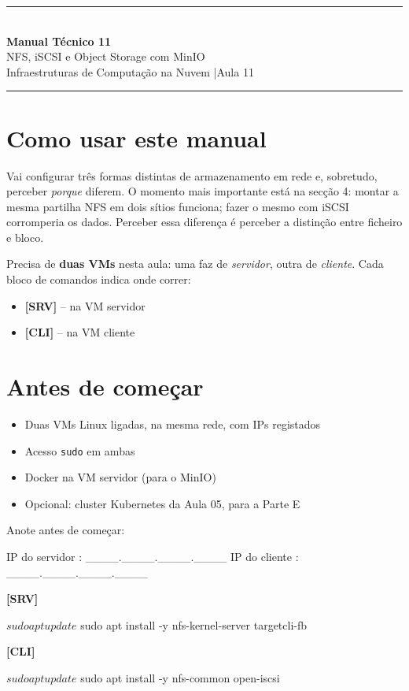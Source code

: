\documentclass[11pt,a4paper]{article}
\newcommand{\manualtitle}[3]{%
  \thispagestyle{empty}
  \begin{center}
  {\color{NudeTaupe}\rule{\textwidth}{0.5pt}}\\[0.5cm]
  {\LARGE\bfseries\color{TextEspresso} Manual Técnico #1}\\[0.35cm]
  {\large\color{TextEspresso} #2}\\[0.3cm]
  {\normalsize\color{NudeTaupe} Infraestruturas de Computação na Nuvem \quad|\quad #3}\\[0.4cm]
  {\color{NudeTaupe}\rule{\textwidth}{0.5pt}}
  \end{center}
  \vspace{0.4cm}
}
\begin{document}
\manualtitle{11}{NFS, iSCSI e Object Storage com MinIO}{Aula 11}

\section*{Como usar este manual}

Vai configurar três formas distintas de armazenamento em rede e, sobretudo, perceber \emph{porque} diferem. O momento mais importante está na secção 4: montar a mesma partilha NFS em dois sítios funciona; fazer o mesmo com iSCSI corromperia os dados. Perceber essa diferença é perceber a distinção entre ficheiro e bloco.

\begin{atencao}
Precisa de \textbf{duas VMs} nesta aula: uma faz de \emph{servidor}, outra de \emph{cliente}. Cada bloco de comandos indica onde correr:
\begin{itemize}
  \item \textbf{[SRV]} -- na VM servidor
  \item \textbf{[CLI]} -- na VM cliente
\end{itemize}
\end{atencao}

\section*{Antes de começar}

\begin{itemize}
  \item[$\square$] Duas VMs Linux ligadas, na mesma rede, com IPs registados
  \item[$\square$] Acesso \texttt{sudo} em ambas
  \item[$\square$] Docker na VM servidor (para o MinIO)
  \item[$\square$] Opcional: cluster Kubernetes da Aula 05, para a Parte E
\end{itemize}

Anote antes de começar:
\begin{terminal}
IP do servidor : ____.____.____.____
IP do cliente  : ____.____.____.____
\end{terminal}

\textbf{[SRV]}
\begin{terminal}
$ sudo apt update
$ sudo apt install -y nfs-kernel-server targetcli-fb
\end{terminal}

\textbf{[CLI]}
\begin{terminal}
$ sudo apt update
$ sudo apt install -y nfs-common open-iscsi
\end{terminal}
\end{document}
